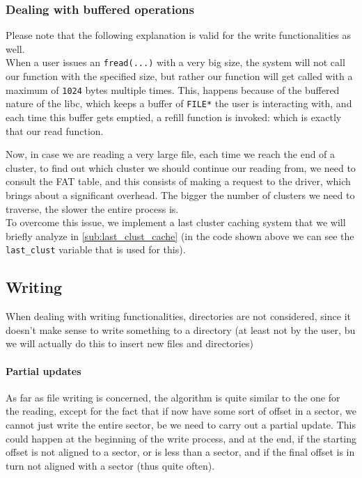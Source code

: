 \documentclass[a4paper,twoside,openright]{report}
\begin{document}
\subsubsection{Dealing with buffered operations}
\label{subsub:deal_with_buf_ops}
Please note that the following explanation is valid for the write functionalities as well.\\

When a user issues an \texttt{fread(...)} with a very big size, the system will not call our function with the specified size, but rather our function will get called with a maximum of \texttt{1024} bytes multiple times.
This, happens because of the buffered nature of the libc, which keeps a buffer of \texttt{FILE*} the user is interacting with, and each time this buffer gets emptied, a refill function is invoked: which is exactly that our read function.

Now, in case we are reading a very large file, each time we reach the end of a cluster, to find out which cluster we should continue our reading from, we need to consult the FAT table, and this consists of making a request to the driver, which brings about a significant overhead.
The bigger the number of clusters we need to traverse, the slower the entire process is.\\

\noindent
To overcome this issue, we implement a last cluster caching system that we will briefly analyze in \ref{sub:last_clust_cache} (in the code shown above we can see the \texttt{last\_clust} variable that is used for this).

\subsection{Writing}
When dealing with writing functionalities, directories are not considered, since it doesn't make sense to write something to a directory (at least not by the user, bu we will actually do this to insert new files and directories)

\paragraph{Partial updates}
As far as file writing is concerned, the algorithm is quite similar to the one for the reading, except for the fact that if now have some sort of offset in a sector, we cannot just write the entire sector, be we need to carry out a partial update.
This could happen at the beginning of the write process, and at the end, if the starting offset is not aligned to a sector, or is less than a sector, and if the final offset is in turn not aligned with a sector (thus quite often).
\end{document}
